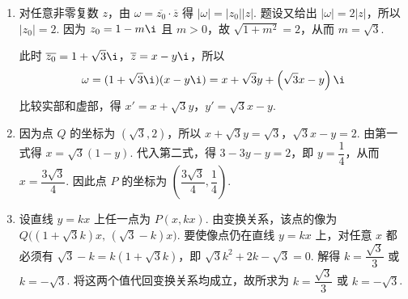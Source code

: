 \begin{solution}
\begin{enumerate}
\item 对任意非零复数 \(z\)，由 \(\omega=\overline{z_0}\cdot\overline{z}\) 得 \(|\omega|=|z_0||z|\). 题设又给出 \(|\omega|=2|z|\)，所以 \(|z_0|=2\). 因为 \(z_0=1-m\i\) 且 \(m>0\)，故 \(\sqrt{1+m^2}=2\)，从而 \(m=\sqrt{3}\).

此时 \(\overline{z_0}=1+\sqrt{3}\i\)，\(\overline{z}=x-y\i\)，所以
\[
\omega=(1+\sqrt{3}\i)(x-y\i)=x+\sqrt{3}y+\left(\sqrt{3}x-y\right)\i
\]
比较实部和虚部，得 \(x'=x+\sqrt{3}y\)，\(y'=\sqrt{3}x-y\).
\item 因为点 \(Q\) 的坐标为 \((\sqrt{3},2)\)，所以
\(x+\sqrt{3}y=\sqrt{3}\)，\(\sqrt{3}x-y=2\).
由第一式得 \(x=\sqrt{3}(1-y)\). 代入第二式，得 \(3-3y-y=2\)，即 \(y=\dfrac14\)，从而 \(x=\dfrac{3\sqrt{3}}{4}\). 因此点 \(P\) 的坐标为 \(\left(\dfrac{3\sqrt{3}}{4},\dfrac14\right)\).
\item 设直线 \(y=kx\) 上任一点为 \(P(x,kx)\). 由变换关系，该点的像为 \(Q\bigl((1+\sqrt{3}k)x,\, (\sqrt{3}-k)x\bigr)\). 要使像点仍在直线 \(y=kx\) 上，对任意 \(x\) 都必须有 \(\sqrt{3}-k=k(1+\sqrt{3}k)\)，即 \(\sqrt{3}k^2+2k-\sqrt{3}=0\). 解得 \(k=\dfrac{\sqrt{3}}{3}\) 或 \(k=-\sqrt{3}\). 将这两个值代回变换关系均成立，故所求为 \(k=\dfrac{\sqrt{3}}{3}\) 或 \(k=-\sqrt{3}\).
\end{enumerate}
\end{solution}
